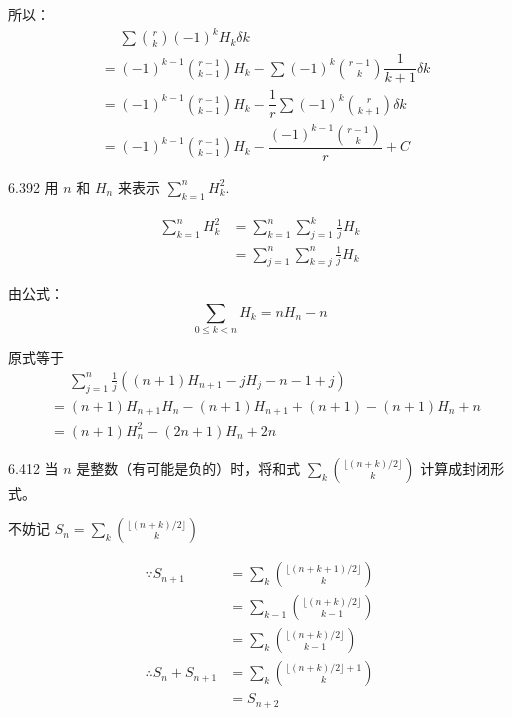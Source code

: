 所以：
\begin{align*}
  &\phantom{=} \sum \binom{r}{k} (-1)^k H_k \delta k \\
  &= (-1)^{k-1} \binom{r-1}{k-1} H_k - \sum (-1)^{k} \binom{r-1}{k} \dfrac{1}{k+1} \delta k \\
  &= (-1)^{k-1} \binom{r-1}{k-1} H_k - \dfrac{1}{r} \sum (-1)^k \binom{r}{k+1} \delta k \\
  &= (-1)^{k-1} \binom{r-1}{k-1} H_k - \dfrac{(-1)^{k-1} \binom{r-1}{k}}{r} + C
\end{align*}

\begin{problem}{6.39}{2}
  用 \( n \) 和 \( H_n \) 来表示 \( \sum_{k=1}^n H_k^2 \).
\end{problem}

\begin{align*}
  \sum_{k=1}^n H_k^2 &= \sum_{k=1}^n \sum_{j=1}^k \frac{1}{j} H_k \\
  &= \sum_{j=1}^n \sum_{k=j}^n \frac{1}{j} H_k
\end{align*}

由公式：
\[
  \boxed{\sum_{0 \leqslant k < n} H_k = nH_n - n}
\]

原式等于
\begin{align*}
  &\phantom{=} \sum_{j=1}^n \frac{1}{j} ((n+1)H_{n+1} - jH_j - n - 1 + j) \\
  &= (n+1)H_{n+1}H_n - (n+1)H_{n+1} + (n+1) - (n+1)H_n + n \\
  &= (n+1) H_n^2 - (2n+1) H_n + 2n
\end{align*}

\begin{problem}{6.41}{2}
  当 \( n \) 是整数（有可能是负的）时，将和式 \( \displaystyle \sum_k \binom{\lfloor (n+k) / 2 \rfloor}{k} \) 计算成封闭形式。
\end{problem}

不妨记 \( S_n = \sum_k \binom{\lfloor (n+k) / 2 \rfloor}{k} \)

\begin{align*}
  \because S_{n+1} &= \sum_k \binom{\lfloor (n+k+1) / 2 \rfloor}{k} \\
  &= \sum_{k-1} \binom{\lfloor (n+k) / 2 \rfloor}{k-1} \\
  &= \sum_k \binom{\lfloor (n+k) / 2 \rfloor}{k-1} \\
  \therefore S_n + S_{n+1} &= \sum_k \binom{\lfloor (n+k) / 2 \rfloor + 1}{k} \\
  &= S_{n+2}
\end{align*}

